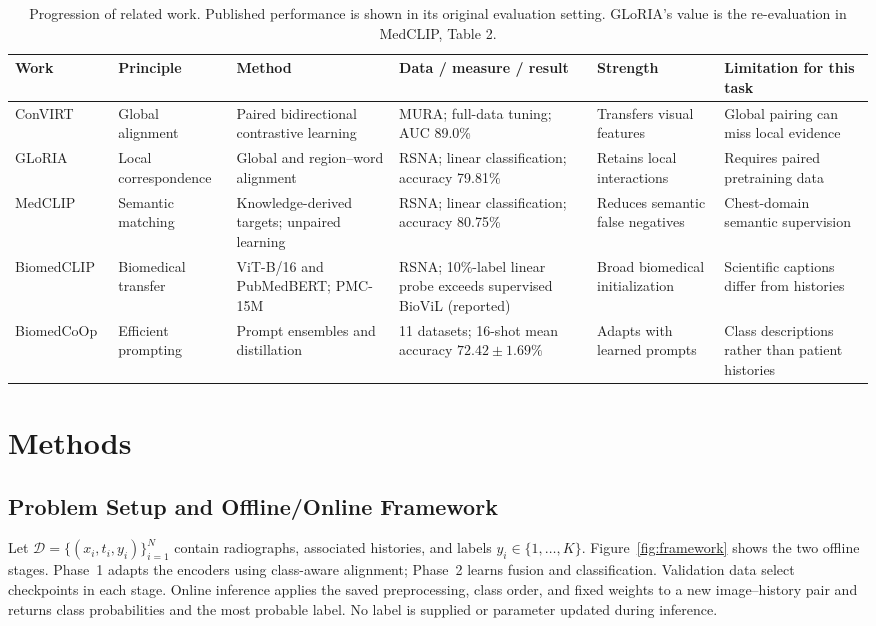 \documentclass[conference,a4paper]{IEEEtran}
\begin{document}
\begin{table}[t]
\caption{Progression of related work. Published performance is shown in its original evaluation setting. GLoRIA's value is the re-evaluation in MedCLIP, Table 2.}
\label{tab:related}
\centering\footnotesize
\begin{tabularx}{\textwidth}{@{}p{21mm}YYYYY@{}}
\toprule
Work & Principle & Method & Data / measure / result & Strength & Limitation for this task \\
\midrule
ConVIRT~\cite{ConVIRT} & Global alignment & Paired bidirectional contrastive learning & MURA; full-data tuning; AUC 89.0\% & Transfers visual features & Global pairing can miss local evidence \\
GLoRIA~\cite{GLoRIA,MedCLIP} & Local correspondence & Global and region--word alignment & RSNA; linear classification; accuracy 79.81\% & Retains local interactions & Requires paired pretraining data \\
MedCLIP~\cite{MedCLIP} & Semantic matching & Knowledge-derived targets; unpaired learning & RSNA; linear classification; accuracy 80.75\% & Reduces semantic false negatives & Chest-domain semantic supervision \\
BiomedCLIP~\cite{BiomedCLIP} & Biomedical transfer & ViT-B/16 and PubMedBERT; PMC-15M & RSNA; 10\%-label linear probe exceeds supervised BioViL (reported) & Broad biomedical initialization & Scientific captions differ from histories \\
BiomedCoOp~\cite{BiomedCoOp} & Efficient prompting & Prompt ensembles and distillation & 11 datasets; 16-shot mean accuracy $72.42\pm1.69\%$ & Adapts with learned prompts & Class descriptions rather than patient histories \\
\bottomrule
\end{tabularx}
\end{table}

\section{Methods}
\subsection{Problem Setup and Offline/Online Framework}
Let $\mathcal D=\{(x_i,t_i,y_i)\}_{i=1}^N$ contain radiographs, associated histories, and labels $y_i\in\{1,\ldots,K\}$. Figure~\ref{fig:framework} shows the two offline stages. Phase~1 adapts the encoders using class-aware alignment; Phase~2 learns fusion and classification. Validation data select checkpoints in each stage. Online inference applies the saved preprocessing, class order, and fixed weights to a new image--history pair and returns class probabilities and the most probable label. No label is supplied or parameter updated during inference.
\end{document}
